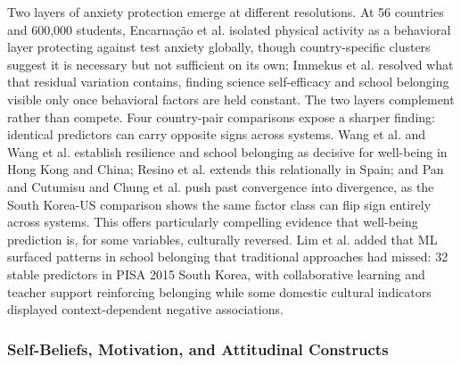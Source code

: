 \documentclass{ieeeaccess}
\begin{document}
Two layers of anxiety protection emerge at different resolutions. At 56 countries and 600,000 students, Encarna\c{c}\~{a}o et al. \cite{encarnacao-etal2025} isolated physical activity as a behavioral layer protecting against test anxiety globally, though country-specific clusters suggest it is necessary but not sufficient on its own; Immekus et al. \cite{immekus-etal2022} resolved what that residual variation contains, finding science self-efficacy and school belonging visible only once behavioral factors are held constant. The two layers complement rather than compete. Four country-pair comparisons expose a sharper finding: identical predictors can carry opposite signs across systems. Wang et al. \cite{wang-king-leung2023} and Wang et al. \cite{wang-king-haw-leung2022} establish resilience and school belonging as decisive for well-being in Hong Kong and China; Resino et al. \cite{resino-constante-amores2024} extends this relationally in Spain; and Pan and Cutumisu \cite{pan-cutumisu2024} and Chung et al. \cite{chungInternationalComparisonStudy2022} push past convergence into divergence, as the South Korea-US comparison shows the same factor class can flip sign entirely across systems. This offers particularly compelling evidence that well-being prediction is, for some variables, culturally reversed. Lim et al. \cite{lim-etal2024} added that ML surfaced patterns in school belonging that traditional approaches had missed: 32 stable predictors in PISA 2015 South Korea, with collaborative learning and teacher support reinforcing belonging while some domestic cultural indicators displayed context-dependent negative associations.

\subsubsection{Self-Beliefs, Motivation, and Attitudinal Constructs}\label{subsubsec4.3.3}
\end{document}
